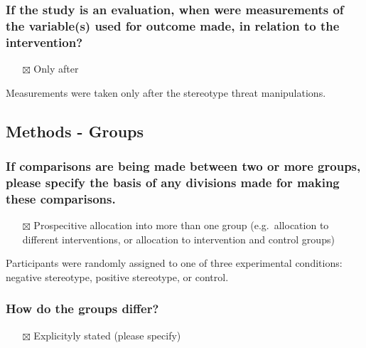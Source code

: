 \documentclass[
  doc, a4paper]{apa7}
\providecommand{\tightlist}{%
  \setlength{\itemsep}{0pt}\setlength{\parskip}{0pt}}
\begin{document}
\subsubsection{If the study is an evaluation, when were measurements of the variable(s) used for outcome made, in relation to the intervention?}\label{if-the-study-is-an-evaluation-when-were-measurements-of-the-variables-used-for-outcome-made-in-relation-to-the-intervention}

\begin{itemize}
\tightlist
\item[$\boxtimes$]
  Only after
\end{itemize}

Measurements were taken only after the stereotype threat manipulations.

\subsection{Methods - Groups}\label{methods---groups}

\subsubsection{If comparisons are being made between two or more groups, please specify the basis of any divisions made for making these comparisons.}\label{if-comparisons-are-being-made-between-two-or-more-groups-please-specify-the-basis-of-any-divisions-made-for-making-these-comparisons.}

\begin{itemize}
\tightlist
\item[$\boxtimes$]
  Prospecitive allocation into more than one group (e.g.~allocation to different interventions, or allocation to intervention and control groups)
\end{itemize}

Participants were randomly assigned to one of three experimental conditions: negative stereotype, positive stereotype, or control.

\subsubsection{How do the groups differ?}\label{how-do-the-groups-differ}

\begin{itemize}
\tightlist
\item[$\boxtimes$]
  Explicityly stated (please specify)
\end{itemize}
\end{document}
